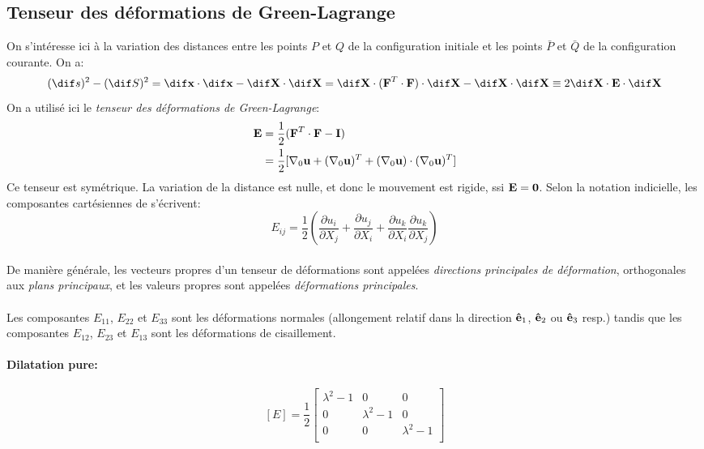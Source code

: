 \subsection{Tenseur des déformations de Green-Lagrange}
On s'intéresse ici à la variation des distances entre les points $P$ et $Q$ de la configuration initiale et les points $\bar{P}$ et $\bar{Q}$ de la configuration courante. On a:
$$(\dif s)^2-(\dif S)^2=\dif \fv{x}\cdot \dif \fv{x}-\dif \fv{X}\cdot \dif \fv{X}=\dif \fv{X}\cdot(\fv{F}^T\cdot\fv{F})\cdot \dif \fv{X}-\dif \fv{X}\cdot \dif \fv{X} \equiv 2\dif \fv{X}\cdot \fv{E} \cdot \dif \fv{X}$$
On a utilisé ici le \emph{tenseur des déformations de Green-Lagrange}:
$$\begin{aligned}
\textbf{E}&=\frac{1}{2}(\textbf{F}^T\cdot \textbf{F}-\textbf{I})\\
 &=\frac{1}{2}[\nabla_0\textbf{u}+(\nabla_0\textbf{u})^T + (\nabla_0\textbf{u})\cdot(\nabla_0\textbf{u})^T ]
 \end{aligned}
$$
Ce tenseur est symétrique. La variation de la distance est nulle, et donc le mouvement est rigide, ssi $\textbf{E}=\textbf{0}$.
Selon la notation indicielle, les composantes cartésiennes de  s'écrivent:
$$E_{ij}=\frac{1}{2}\left(\frac{\partial u_i}{\partial X_j}+\frac{\partial u_j}{\partial X_i}+\frac{\partial u_k}{\partial X_i}\frac{\partial u_k}{\partial X_j}\right)$$
\paragraph{}
De manière générale, les vecteurs propres d'un tenseur de déformations sont appelées \emph{directions principales de déformation}, orthogonales aux \emph{plans principaux}, et les valeurs propres sont appelées \emph{déformations principales}.
\paragraph{}
Les composantes $E_{11}$, $E_{22}$ et $E_{33}$ sont les déformations normales (allongement relatif dans la direction $\textbf{ê}_1$, $\textbf{ê}_2$ ou $\textbf{ê}_3$ resp.) tandis que les composantes $E_{12}$, $E_{23}$ et $E_{13}$ sont les déformations de cisaillement.
\paragraph{Dilatation pure:}
$$[E]=\frac{1}{2}
\left[\begin{array}{ccc}
\lambda^2-1&0&0\\
0&\lambda^2-1&0\\
0&0&\lambda^2-1\\
\end{array}\right]$$
